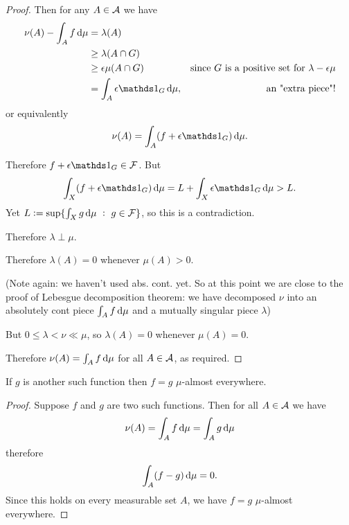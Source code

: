 \begin{proof}
  Then for any $A \in \mathcal A$ we have
  \begin{align*}
    \nu(A) - \int_A f \dmu
    &= \lambda(A) \\
    &\geq \lambda(A \cap G) \\
    &\geq \eps\mu(A \cap G) &\text{since $G$ is a positive set for $\lambda - \eps\mu$} \\
    &=\int_A \eps\ind_{G} \dmu, &\text{~an "extra piece"!}
  \end{align*}
  or equivalently
  \begin{align*}
    \nu(A) = \int_A (f + \eps\ind_G) \dmu.
  \end{align*}

  Therefore $f + \eps\ind_G \in \mc F$. But
  \begin{align*}
    \int_X (f + \eps\ind_G) \dmu = L + \int_X\eps\ind_G \dmu > L.
  \end{align*}
  Yet $L := \sup \{\int_X g \dmu ~:~ g \in \mc F\}$, so this is a contradiction.

  Therefore $\lambda \perp \mu$.

  Therefore $\lambda(A) = 0$ whenever $\mu(A) > 0$.

  (Note again: we haven't used abs. cont. yet. So at this point we are close to the proof of Lebesgue
  decomposition theorem: we have decomposed $\nu$ into an absolutely cont piece $\int_A f \dmu$ and a mutually
  singular piece $\lambda$)

  But $0 \leq \lambda < \nu \ll \mu$, so $\lambda(A) = 0$ whenever $\mu(A) = 0$.

  Therefore $\nu(A) = \int_A f \dmu$ for all $A \in \mathcal A$, as required.
\end{proof}




\begin{claim*}
  If $g$ is another such function then $f = g$ $\mu$-almost everywhere.
\end{claim*}

\begin{proof}
    Suppose $f$ and $g$ are two such functions. Then for all $A \in \mathcal A$ we have
  \begin{align*}
    \nu(A) = \int_A f \d\mu = \int_A g \d\mu
  \end{align*}
  therefore
  \begin{align*}
    \int_A (f - g) \dmu = 0.
  \end{align*}
  Since this holds on every measurable set $A$, we have $f = g$ $\mu$-almost everywhere.
\end{proof}


